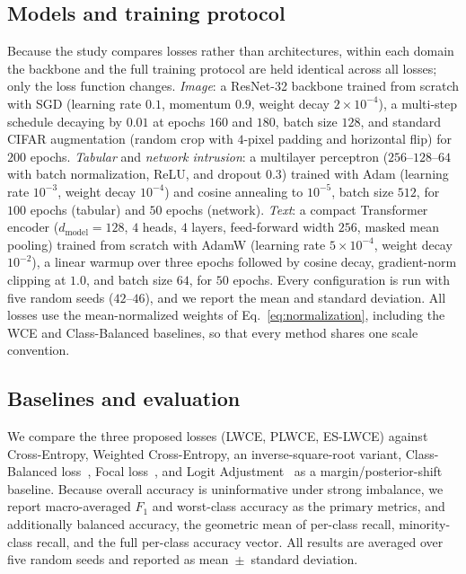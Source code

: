 \documentclass[a4paper,fleqn]{cas-sc}
\begin{document}
\subsection{Models and training protocol}\label{sec:protocol}
Because the study compares losses rather than architectures, within each domain the
backbone and the full training protocol are held identical across all losses; only
the loss function changes. \emph{Image}: a ResNet-32 backbone trained from scratch
with SGD (learning rate $0.1$, momentum $0.9$, weight decay $2\times10^{-4}$), a
multi-step schedule decaying by $0.01$ at epochs $160$ and $180$, batch size $128$,
and standard CIFAR augmentation (random crop with $4$-pixel padding and horizontal
flip) for $200$ epochs. \emph{Tabular} and \emph{network intrusion}: a multilayer
perceptron ($256$--$128$--$64$ with batch normalization, ReLU, and dropout $0.3$)
trained with Adam (learning rate $10^{-3}$, weight decay $10^{-4}$) and cosine
annealing to $10^{-5}$, batch size $512$, for $100$ epochs (tabular) and $50$ epochs
(network). \emph{Text}: a compact Transformer encoder ($d_{\mathrm{model}}=128$,
$4$ heads, $4$ layers, feed-forward width $256$, masked mean pooling) trained from
scratch with AdamW (learning rate $5\times10^{-4}$, weight decay $10^{-2}$), a
linear warmup over three epochs followed by cosine decay, gradient-norm clipping at
$1.0$, and batch size $64$, for $50$ epochs. Every configuration is run with five
random seeds ($42$--$46$), and we report the mean and standard deviation. All losses
use the mean-normalized weights of Eq.~\eqref{eq:normalization}, including the WCE
and Class-Balanced baselines, so that every method shares one scale convention.

\subsection{Baselines and evaluation}\label{sec:setup}
We compare the three proposed losses (LWCE, PLWCE, ES-LWCE) against Cross-Entropy,
Weighted Cross-Entropy, an inverse-square-root variant, Class-Balanced
loss~\citep{cui2019}, Focal loss~\citep{lin2017}, and Logit
Adjustment~\citep{menon2021} as a margin/posterior-shift baseline. Because overall
accuracy is uninformative under strong imbalance, we report macro-averaged $F_1$
and worst-class accuracy as the primary metrics, and additionally balanced
accuracy, the geometric mean of per-class recall, minority-class recall, and the
full per-class accuracy vector. All results are averaged over five random seeds and
reported as mean~$\pm$~standard deviation.
\end{document}
